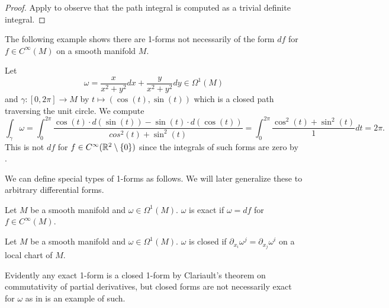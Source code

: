 \begin{proof}
    Apply  to observe that the path integral is computed as a trivial definite integral. 
\end{proof}
The following example shows there are 1-forms not necessarily of the form $df$ for $f\in C^{\infty}(M)$ on a smooth manifold $M$. 
\begin{example}\label{ex: loop integral of 1-form}
    Let 
    $$\omega=\frac{x}{x^{2}+y^{2}}dx+\frac{y}{x^{2}+y^{2}}dy\in\Omega^{1}(M)$$
    and $\gamma:[0,2\pi]\to M$ by $t\mapsto(\cos(t),\sin(t))$ which is a closed path traversing the unit circle. We compute 
    $$\int_{\gamma}\omega=\int_{0}^{2\pi}\frac{\cos(t)\cdot d(\sin(t))-\sin(t)\cdot d(\cos(t))}{cos^{2}(t)+\sin^{2}(t)}=\int_{0}^{2\pi}\frac{\cos^{2}(t)+\sin^{2}(t)}{1}dt=2\pi.$$
    This is not $df$ for $f\in C^{\infty}(\mathbb{R}^{2}\setminus\{0\})$ since the integrals of such forms are zero by . 
\end{example}
We can define special types of 1-forms as follows. We will later generalize these to arbitrary differential forms. 
\begin{definition}\label{def: exact 1-form}
    Let $M$ be a smooth manifold and $\omega\in\Omega^{1}(M)$. $\omega$ is exact if $\omega=df$ for $f\in C^{\infty}(M)$. 
\end{definition}
\begin{definition}\label{def: closed 1-form}
    Let $M$ be a smooth manifold and $\omega\in\Omega^{1}(M)$. $\omega$ is closed if $\partial_{x_{i}}\omega^{j}=\partial_{x_{j}}\omega^{i}$ on a local chart of $M$. 
\end{definition}
Evidently any exact 1-form is a closed 1-form by Clariault's theorem on commutativity of partial derivatives, but closed forms are not necessarily exact for $\omega$ as in  is an example of such. 

